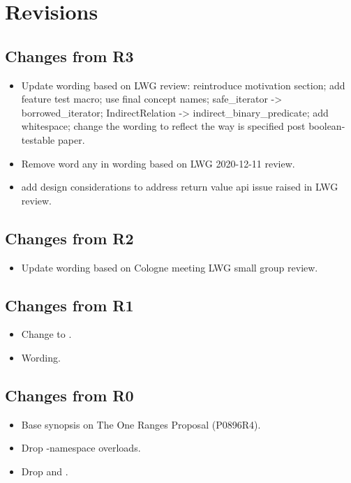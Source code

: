 \section{Revisions}

\subsection{Changes from R3}

\begin{itemize}
  \item Update wording based on LWG review: reintroduce motivation section; add feature test macro; use final concept names; safe_iterator -> borrowed_iterator; IndirectRelation -> indirect_binary_predicate; add whitespace; change the wording to reflect the way  is specified post boolean-testable paper.
  \item Remove word any in wording based on LWG 2020-12-11 review.
  \item add design considerations to address return value api issue raised in LWG review.
\end{itemize}

\subsection{Changes from R2}

\begin{itemize}
  \item Update wording based on Cologne meeting LWG small group review.
\end{itemize}

\subsection{Changes from R1}

\begin{itemize}
  \item Change  to .
  \item Wording.
\end{itemize}

\subsection{Changes from R0}

\begin{itemize}
  \item Base synopsis on The One Ranges Proposal (P0896R4).
  \item Drop -namespace overloads.
  \item Drop  and .
\end{itemize}
